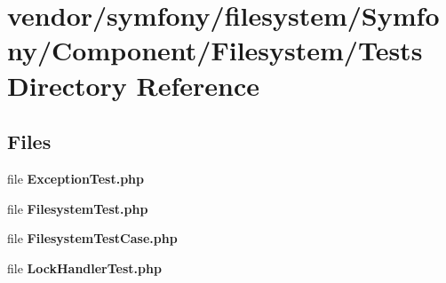 \section{vendor/symfony/filesystem/\+Symfony/\+Component/\+Filesystem/\+Tests Directory Reference}
\label{dir_77849fd3c1bca8454e85d2305219d6b8}
\subsection*{Files}
\begin{DoxyCompactItemize}
\item 
file {\bf Exception\+Test.\+php}
\item 
file {\bf Filesystem\+Test.\+php}
\item 
file {\bf Filesystem\+Test\+Case.\+php}
\item 
file {\bf Lock\+Handler\+Test.\+php}
\end{DoxyCompactItemize}
